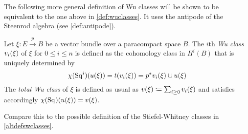 The following more general definition of Wu classes
will be shown to be equivalent to the one above in
\ref{def:wuclasses}.
It uses the antipode of the Steenrod algebra (see \autoref{def:antipode}). 
\begin{Def}\label{def:altwuclasses}
  Let $\xi\colon E\xrightarrow{p} B$ be a vector bundle over a
  paracompact space $B$.
  The $i$th \emph{Wu class} $v_i(\xi)$ of $\xi$ for $0\leq i\leq n$
  is defined as the cohomology class in $H^i(B)$ that is uniquely
  determined by
  \begin{gather*}
    \chi(\mathrm{Sq}^{i})(u(\xi)) = t(v_i(\xi)) = {p}^* v_i(\xi) \cup u(\xi)
  \end{gather*}
  The \emph{total Wu class} of $\xi$ is defined as usual as
  $v(\xi)\coloneqq\sum_{i\geq0}v_i(\xi)$ and satisfies accordingly 
  $\chi(\mathrm{Sq}^{})(u(\xi))=v(\xi)$.
\end{Def}
\begin{Rem}
  Compare this to the possible definition of the Stiefel-Whitney
  classes in \autoref{altdefswclasses}.
\end{Rem}

